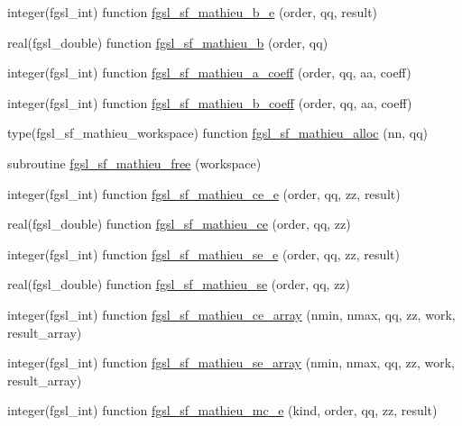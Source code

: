 \begin{DoxyCompactItemize}
\item 
integer(fgsl\+\_\+int) function \hyperlink{specfunc_8finc_a1a81ca69a3ae937454c544c91a2f8320}{fgsl\+\_\+sf\+\_\+mathieu\+\_\+b\+\_\+e} (order, qq, result)
\item 
real(fgsl\+\_\+double) function \hyperlink{specfunc_8finc_a833786723ab64210484deb30f0ab4bb8}{fgsl\+\_\+sf\+\_\+mathieu\+\_\+b} (order, qq)
\item 
integer(fgsl\+\_\+int) function \hyperlink{specfunc_8finc_a76a05a63e56c79c2fff33a325b72554d}{fgsl\+\_\+sf\+\_\+mathieu\+\_\+a\+\_\+coeff} (order, qq, aa, coeff)
\item 
integer(fgsl\+\_\+int) function \hyperlink{specfunc_8finc_a569c8573172f7859aefb92374fb36187}{fgsl\+\_\+sf\+\_\+mathieu\+\_\+b\+\_\+coeff} (order, qq, aa, coeff)
\item 
type(fgsl\+\_\+sf\+\_\+mathieu\+\_\+workspace) function \hyperlink{specfunc_8finc_a2ff44b9909122ce9f99354c6f1be291e}{fgsl\+\_\+sf\+\_\+mathieu\+\_\+alloc} (nn, qq)
\item 
subroutine \hyperlink{specfunc_8finc_a5b3b9f5feb4da60ef1eb6617a297002d}{fgsl\+\_\+sf\+\_\+mathieu\+\_\+free} (workspace)
\item 
integer(fgsl\+\_\+int) function \hyperlink{specfunc_8finc_aff3788f2e362cb1bf281797a59f11feb}{fgsl\+\_\+sf\+\_\+mathieu\+\_\+ce\+\_\+e} (order, qq, zz, result)
\item 
real(fgsl\+\_\+double) function \hyperlink{specfunc_8finc_acb5c68d10bc940b86cad1a6b4252bb9c}{fgsl\+\_\+sf\+\_\+mathieu\+\_\+ce} (order, qq, zz)
\item 
integer(fgsl\+\_\+int) function \hyperlink{specfunc_8finc_ae3500fb972fddf7660f59c4b8ae7012c}{fgsl\+\_\+sf\+\_\+mathieu\+\_\+se\+\_\+e} (order, qq, zz, result)
\item 
real(fgsl\+\_\+double) function \hyperlink{specfunc_8finc_aebbfd3db9e5c09503609b150d1ca987e}{fgsl\+\_\+sf\+\_\+mathieu\+\_\+se} (order, qq, zz)
\item 
integer(fgsl\+\_\+int) function \hyperlink{specfunc_8finc_ad3241f36e6454554da6459b9b9816708}{fgsl\+\_\+sf\+\_\+mathieu\+\_\+ce\+\_\+array} (nmin, nmax, qq, zz, work, result\+\_\+array)
\item 
integer(fgsl\+\_\+int) function \hyperlink{specfunc_8finc_ad9538541b622ed2201d96760315af07a}{fgsl\+\_\+sf\+\_\+mathieu\+\_\+se\+\_\+array} (nmin, nmax, qq, zz, work, result\+\_\+array)
\item 
integer(fgsl\+\_\+int) function \hyperlink{specfunc_8finc_a9aec1b4b6d674fdfea71ac2d6e50600f}{fgsl\+\_\+sf\+\_\+mathieu\+\_\+mc\+\_\+e} (kind, order, qq, zz, result)

\end{DoxyCompactItemize}
